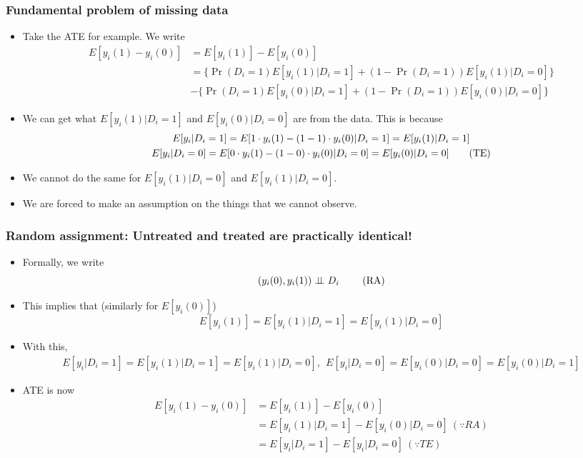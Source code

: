 \documentclass[aspectratio=169]{beamer}
\begin{document}
\begin{frame}
\frametitle{Fundamental problem of missing data}
\begin{itemize}
\item Take the ATE for example. We write
\begin{align*}
E[y_i(1)-y_i(0)] & = E[y_i(1)]-E[y_i(0)]\\
&=\{\Pr(D_i=1)E[y_i(1)|D_i=1]+(1-\Pr(D_i=1))E[y_i(1)|D_i=0]\}\\
&-\{\Pr(D_i=1)E[y_i(0)|D_i=1]+(1-\Pr(D_i=1))E[y_i(0)|D_i=0]\}
\end{align*}
\item We can get what $E[y_i(1)|D_i=1]$ and $E[y_i(0)|D_i=0]$ are from the data. This is because 
\begin{gather*}
E[y_i|D_i=1]=E[1\cdot y_i(1)-(1-1)\cdot y_i(0)|D_i=1]=E[y_i(1)|D_i=1]\\
E[y_i|D_i=0]=E[0\cdot y_i(1)-(1-0)\cdot y_i(0)|D_i=0]=E[y_i(0)|D_i=0] \tag{\text{TE}}\label{TE}
\end{gather*}
\item We cannot do the same for $E[y_i(1)|D_i=0]$ and $E[y_i(1)|D_i=0]$.  
\item We are forced to make an assumption on the things that we cannot observe. 
\end{itemize}
\end{frame}

\begin{frame}
\frametitle{Random assignment: Untreated and treated are practically identical!}
\begin{itemize}
\item Formally, we write
\[
(y_i(0), y_i(1))\perp \!\!\! \perp D_i \ \tag{\text{RA}}\label{RA}
\]
\item This implies that (similarly for $E[y_i(0)]$)
\[
E[y_i(1)]=E[y_i(1)|D_i=1]=E[y_i(1)|D_i=0]
\]
\item With this, 
\small{\begin{gather*}
E[y_i|D_i=1]=E[y_i(1)|D_i=1]=E[y_i(1)|D_i=0],\ \  E[y_i|D_i=0]=E[y_i(0)|D_i=0]=E[y_i(0)|D_i=1]
\end{gather*}}\normalsize
\item ATE is now
\[
\begin{aligned}
E[y_i(1)-y_i(0)]&=E[y_i(1)]-E[y_i(0)]\\
&=E[y_i(1)|D_i=1]-E[y_i(0)|D_i=0] \ (\because RA)\\
&=E[y_i|D_i=1]-E[y_i|D_i=0] \ (\because TE)
\end{aligned}
\]
\end{itemize}
\end{frame}
\end{document}
